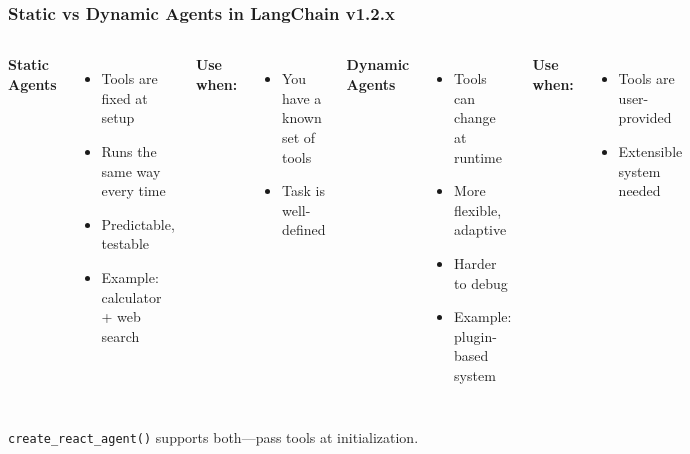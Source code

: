 \documentclass[aspectratio=169,11pt]{beamer}
\begin{document}
\begin{frame}
\frametitle{Static vs Dynamic Agents in LangChain v1.2.x}

\begin{columns}
\textbf{Static Agents}
\begin{itemize}
  \item Tools are fixed at setup
  \item Runs the same way every time
  \item Predictable, testable
  \item Example: calculator + web search
\end{itemize}

\vspace{0.5cm}

\textbf{Use when:}
\begin{itemize}
  \item You have a known set of tools
  \item Task is well-defined
\end{itemize}

\textbf{Dynamic Agents}
\begin{itemize}
  \item Tools can change at runtime
  \item More flexible, adaptive
  \item Harder to debug
  \item Example: plugin-based system
\end{itemize}

\vspace{0.5cm}

\textbf{Use when:}
\begin{itemize}
  \item Tools are user-provided
  \item Extensible system needed
\end{itemize}
\end{columns}

\vspace{0.5cm}

\begin{tipbox}[LangChain v1.2.x]
\texttt{create\_react\_agent()} supports both—pass tools at initialization.
\end{tipbox}

\end{frame}
\end{document}
